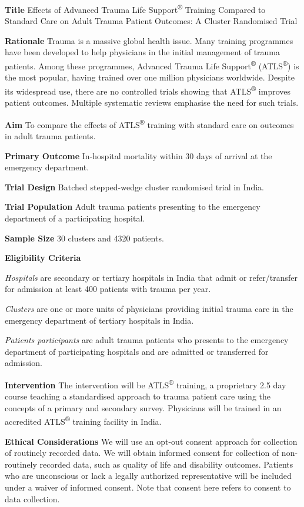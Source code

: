 \documentclass[
]{scrartcl}
\begin{document}
\textbf{Title} Effects of Advanced Trauma Life
Support\textsuperscript{®} Training Compared to Standard Care on Adult
Trauma Patient Outcomes: A Cluster Randomised Trial

\textbf{Rationale} Trauma is a massive global health issue. Many
training programmes have been developed to help physicians in the
initial management of trauma patients. Among these programmes, Advanced
Trauma Life Support\textsuperscript{®} (ATLS\textsuperscript{®}) is the
most popular, having trained over one million physicians worldwide.
Despite its widespread use, there are no controlled trials showing that
ATLS\textsuperscript{®} improves patient outcomes. Multiple systematic
reviews emphasise the need for such trials.

\textbf{Aim} To compare the effects of ATLS\textsuperscript{®} training
with standard care on outcomes in adult trauma patients.

\textbf{Primary Outcome} In-hospital mortality within 30 days of arrival
at the emergency department.

\textbf{Trial Design} Batched stepped-wedge cluster randomised trial in
India.

\textbf{Trial Population} Adult trauma patients presenting to the
emergency department of a participating hospital.

\textbf{Sample Size} 30 clusters and 4320 patients.

\textbf{Eligibility Criteria}

\emph{Hospitals} are secondary or tertiary hospitals in India that admit
or refer/transfer for admission at least 400 patients with trauma per
year.

\emph{Clusters} are one or more units of physicians providing initial
trauma care in the emergency department of tertiary hospitals in India.

\emph{Patients participants} are adult trauma patients who presents to
the emergency department of participating hospitals and are admitted or
transferred for admission.

\textbf{Intervention} The intervention will be ATLS\textsuperscript{®}
training, a proprietary 2.5 day course teaching a standardised approach
to trauma patient care using the concepts of a primary and secondary
survey. Physicians will be trained in an accredited
ATLS\textsuperscript{®} training facility in India.

\textbf{Ethical Considerations} We will use an opt-out consent approach
for collection of routinely recorded data. We will obtain informed
consent for collection of non-routinely recorded data, such as quality
of life and disability outcomes. Patients who are unconscious or lack a
legally authorized representative will be included under a waiver of
informed consent. Note that consent here refers to consent to data
collection.
\end{document}
